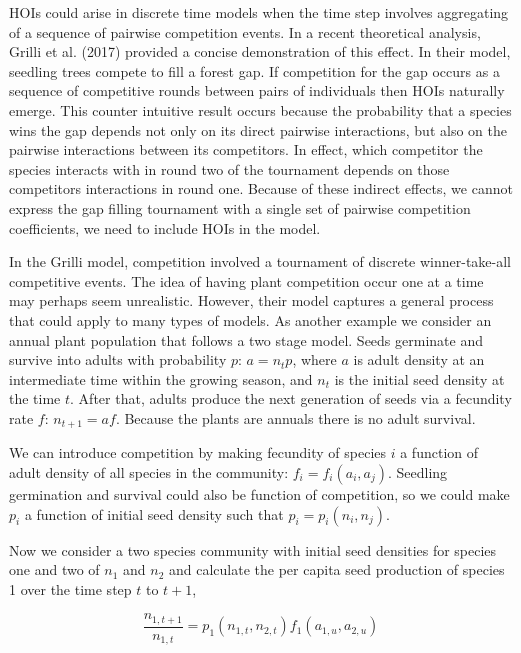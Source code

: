 \documentclass[12pt,]{article}
\begin{document}
HOIs could arise in discrete time models when the time step involves
aggregating of a sequence of pairwise competition events. In a recent
theoretical analysis, Grilli et al. (2017) provided a concise
demonstration of this effect. In their model, seedling trees compete to
fill a forest gap. If competition for the gap occurs as a sequence of
competitive rounds between pairs of individuals then HOIs naturally
emerge. This counter intuitive result occurs because the probability
that a species wins the gap depends not only on its direct pairwise
interactions, but also on the pairwise interactions between its
competitors. In effect, which competitor the species interacts with in
round two of the tournament depends on those competitors interactions in
round one. Because of these indirect effects, we cannot express the gap
filling tournament with a single set of pairwise competition
coefficients, we need to include HOIs in the model.

In the Grilli model, competition involved a tournament of discrete
winner-take-all competitive events. The idea of having plant competition
occur one at a time may perhaps seem unrealistic. However, their model
captures a general process that could apply to many types of models. As
another example we consider an annual plant population that follows a
two stage model. Seeds germinate and survive into adults with
probability \(p\): \(a = n_{t}p\), where \(a\) is adult density at an
intermediate time within the growing season, and \(n_{t}\) is the
initial seed density at the time \(t\). After that, adults produce the
next generation of seeds via a fecundity rate \(f\): \(n_{t+1} = af\).
Because the plants are annuals there is no adult survival.

We can introduce competition by making fecundity of species \(i\) a
function of adult density of all species in the community:
\(f_i = f_i(a_i, a_j)\). Seedling germination and survival could also be
function of competition, so we could make \(p_i\) a function of initial
seed density such that \(p_i = p_i(n_i, n_j)\).

Now we consider a two species community with initial seed densities for
species one and two of \(n_1\) and \(n_2\) and calculate the per capita
seed production of species 1 over the time step \(t\) to \(t+1\),

\vspace{-1em}

\begin{equation} \label{eq2}
\frac{n_{1,t+1}}{n_{1,t}} = p_1( n_{1,t}, n_{2,t} )f_1( a_{1,u}, a_{2,u} ) 
\end{equation}
\end{document}

